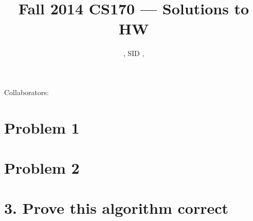 \documentclass[11pt]{article}
\title{Fall 2014 CS170 --- Solutions to HW \Homework}
\author{\Name, SID \SID, \texttt{\Login}}
\begin{document}
\maketitle

Collaborators:

\section*{Problem 1}
\newpage

\section*{Problem 2}
\newpage

\section*{3. Prove this algorithm correct}
\end{document}
